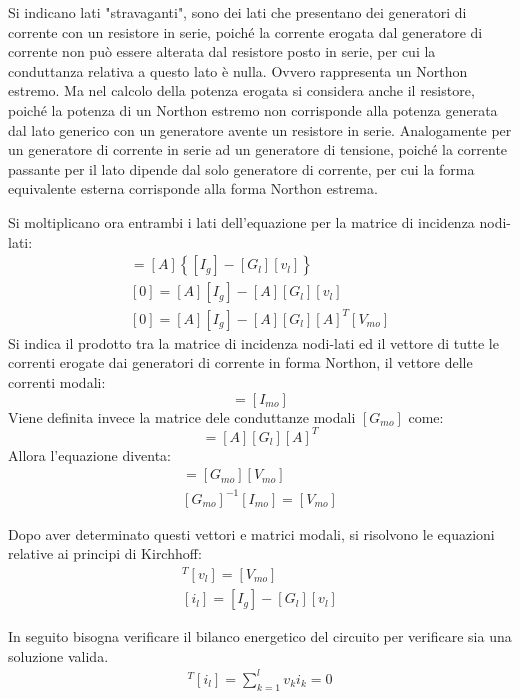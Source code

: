 \documentclass{article}
\numberwithin{equation}{subsection}
\begin{document}
Si indicano lati "stravaganti", sono dei lati che presentano dei generatori di corrente con un resistore in serie, poiché la corrente erogata dal generatore di corrente non può 
essere alterata dal resistore posto in serie, per cui la conduttanza relativa a questo lato è nulla. Ovvero rappresenta un Northon estremo. Ma nel calcolo della potenza 
erogata si considera anche il resistore, poiché la potenza di un Northon estremo non corrisponde alla potenza generata dal lato generico con un generatore avente un resistore in 
serie. 
Analogamente per un generatore di corrente in serie ad un generatore di tensione, poiché la corrente passante per il lato dipende dal solo generatore di corrente, per cui la 
forma equivalente esterna corrisponde alla forma Northon estrema. 

Si moltiplicano ora entrambi i lati dell'equazione per la matrice di incidenza nodi-lati:
\begin{gather*}
    [A][i_l]=[A]\left\{[I_g]-[G_l][v_l]\right\}\\
    [0]=[A][I_g]-[A][G_l][v_l]\\
    [0]=[A][I_g]-[A][G_l][A]^T[V_{mo}]
\end{gather*}
Si indica il prodotto tra la matrice di incidenza nodi-lati ed il vettore di tutte le correnti erogate dai generatori di corrente in forma Northon, il vettore delle correnti 
modali:
\begin{equation*}
    [A][I_g]=[I_{mo}]
\end{equation*}
Viene definita invece la matrice dele conduttanze modali $[G_{mo}]$ come:
\begin{equation*}
    [G_{mo}]=[A][G_l][A]^T
\end{equation*}
Allora l'equazione diventa:
\begin{gather*}
    [I_{mo}]=[G_{mo}][V_{mo}]\\
    [G_{mo}]^{-1}[I_{mo}]=[V_{mo}]
\end{gather*}

Dopo aver determinato questi vettori e matrici modali, si risolvono le equazioni relative ai principi di Kirchhoff: 
\begin{gather*}
    [A]^T[v_l]=[V_{mo}]\\
    [i_l]=[I_g]-[G_l][v_l]
\end{gather*}

In seguito bisogna verificare il bilanco energetico del circuito per verificare sia una soluzione valida. 
\begin{gather*}
    [v_l]^T[i_l]=\displaystyle\sum_{k=1}^lv_ki_k=0
\end{gather*}
\end{document}
